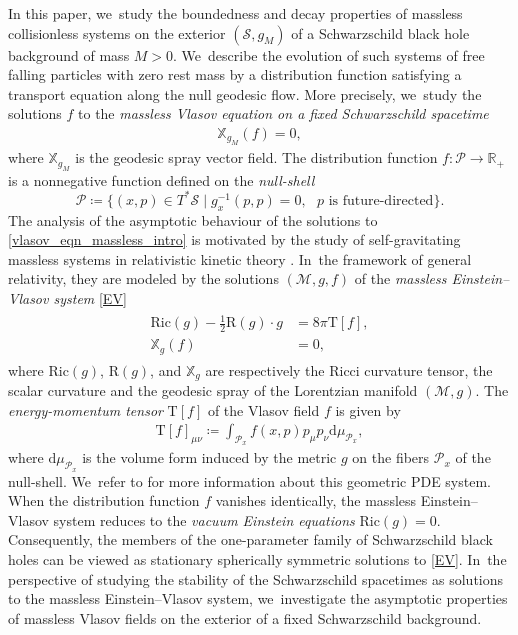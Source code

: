 \documentclass[10pt]{amsart}
\theoremstyle{plain}
\theoremstyle{definition}
\newcommand\R{{\mathbb{R}}}
\newcommand\T{{\mathbb{X}}}
\newcommand\dr{{\mathrm{d}}}
\begin{document}
In this paper, we~study the boundedness and decay properties of massless collisionless systems on the exterior $(\mathcal{S},g_M)$ of a Schwarzschild black hole background of mass $M>0$. We~describe the evolution of such systems of free falling particles with zero rest mass by a distribution function satisfying a transport equation along the null geodesic flow. More precisely, we~study the solutions $f$ to the \emph{massless Vlasov equation on a fixed Schwarzschild spacetime}
\begin{align}\label{vlasov_eqn_massless_intro}
\T_{g_M}(f)=0,
\end{align}
where $\T_{g_M}$ is the geodesic spray vector field. The distribution function $f \colon \mathcal{P }\to \R_+$ is a nonnegative function defined on the \emph{null-shell}
\begin{equation}\label{def_first_intro_null_shell}
\mathcal{P} \coloneqq \bigl\{ (x,p)\in T^*\mathcal{S}\mid g_x^{-1}(p,p)=0,\text{ $p$ is future-directed} \bigr\}.
\end{equation}
The analysis of the asymptotic behaviour of the solutions to \eqref{vlasov_eqn_massless_intro} is motivated by the study of self-gravitating massless systems in relativistic kinetic theory \cite{A11,AGS}. In~the framework of general relativity, they are modeled by the solutions $(\mathcal{M},g,f)$ of the \emph{massless Einstein--Vlasov system} \eqref{EV}
\begin{align} \tag{EV}
\begin{aligned}\label{EV}
\mathrm{Ric}(g)-\frac{1}{2}\mathrm{R}(g)\cdot g&=8\pi \mathrm{T}[f],\\
\T_g(f)&=0,
\end{aligned}
\end{align}
where $\mathrm{Ric}(g)$, $\mathrm{R}(g)$, and $\T_g$ are respectively the Ricci curvature tensor, the scalar curvature and the geodesic spray of the Lorentzian manifold $(\mathcal{M},g)$. The \emph{energy-momentum tensor} $\mathrm{T}[f]$ of the Vlasov field $f$ is given by
\begin{align} \label{energy_momentum_local_geometry_intro}
\mathrm{T} [f]_{ \mu \nu } \coloneqq \int_{\mathcal{P}_x} f(x,p) p_\mu p_\nu \dr \mu_{\mathcal{P}_x},
\end{align}
where $\dr \mu_{\mathcal{P}_x}$ is the volume form induced by the metric $g$ on the fibers $\mathcal{P}_x$ of the null-shell. We~refer to \cite{AR08,CB09,A11} for more information about this geometric PDE system. When the distribution function $f$ vanishes identically, the massless Einstein--Vlasov system reduces to the \emph{vacuum Einstein equations} $\mathrm{Ric}(g)\!=\!0$. Consequently, the members of the one-parameter family of Schwarzschild black holes can be viewed as stationary spherically symmetric solutions to \eqref{EV}. In~the perspective of studying the stability of the Schwarzschild spacetimes as solutions to the massless Einstein--Vlasov system, we~investigate the asymptotic properties of massless Vlasov fields on the exterior of a fixed Schwarzschild background.
\end{document}
